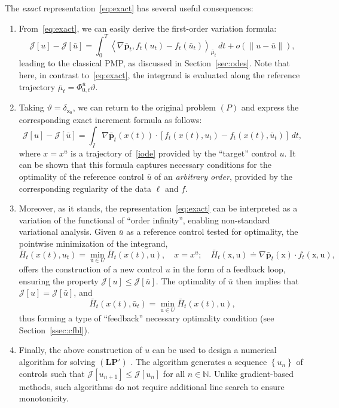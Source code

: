 \documentclass[sn-mathphys-num]{sn-jnl}
\numberwithin{equation}{section}
\theoremstyle{mythm}
\theoremstyle{mydef}
\begin{document}
\medskip

The \emph{exact} representation~\eqref{eq:exact} has several useful consequences:
\begin{enumerate}
  \item From~\eqref{eq:exact}, we can easily derive the first-order variation formula:
\begin{equation*}
  \mathcal{J}[u] - \mathcal{J}[\bar{u}] = \int_0^T \left<\nabla \bar{\bm p}_t, f_t(u_t)-f_t(\bar{u}_t)\right>_{\bar{\mu}_t} \, d t + o(\|u-\bar{u}\|), 
\end{equation*}
leading to the classical PMP, as discussed in Section~\ref{sec:odes}. Note that here, in contrast to~\eqref{eq:exact}, the integrand is evaluated along the reference trajectory \( \bar{\mu}_t = \Phi^{\bar{u}}_{0,t} \vartheta \). 

\item Taking \( \vartheta = \delta_{\mathrm{x}_0} \), we can return to the original problem \( (P) \) and express the corresponding exact increment formula as follows:
\begin{equation*}
  \mathcal{J}[u] - \mathcal{J}[\bar{u}] = \int_I \nabla \bar{\bm p}_t\left(x(t)\right)\cdot \left[f_t\left(x(t),u_t\right)-f_t\left(x(t),\bar{u}_t\right)\right] \, d t,
\end{equation*}
where \( x=x^u \) is a trajectory of~\eqref{iode} provided by the ``target'' control \( u \). It can be shown that this formula captures necessary conditions for the optimality of the reference control $\bar u$ of an \emph{arbitrary order}, provided by the corresponding regularity of the data \( \ell \) and \( f \).

\item Moreover, as it stands, the representation~\eqref{eq:exact} can be interpreted as a variation of the functional of ``order infinity'', enabling non-standard variational analysis. Given \( \bar{u} \) as a reference control tested for optimality, the pointwise minimization of the integrand,
\[
    \bar{H}_t(x(t), u_t) = \min_{\mathrm{u} \in U} \bar{H}_t(x(t), \mathrm{u}), \quad x = x^{u}; \quad \bar{H}_t(\mathrm{x}, \mathrm{u}) \doteq \nabla \bar{\bm p}_t\left(\mathrm{x}\right)\cdot f_t\left(\mathrm{x}, \mathrm{u}\right),
\]
offers the construction of a new control \( u \) in the form of a feedback loop, ensuring the property \( \mathcal{J}[u] \leq \mathcal{J}[\bar{u}] \). The optimality of \( \bar{u} \) then implies that \( \mathcal{J}[u] = \mathcal{J}[\bar{u}] \), and
\[
    \bar{H}_t(x(t), \bar{u}_t) = \min_{\mathrm{u} \in U} \bar{H}_t(x(t), \mathrm{u}),
\]
thus forming a type of ``feedback'' necessary optimality condition (see Section~\ref{ssec:cfbl}).

\item Finally, the above construction of \( u \) can be used to design a numerical algorithm for solving \( (\bm{LP}') \) \cite{pogodaevExactFormulaeIncrement2024}. The algorithm generates a sequence \( \left\{u_n\right\} \) of controls such that \( \mathcal{J}[u_{n+1}] \leq \mathcal{J}[u_n] \) for all \( n \in \mathbb{N} \). Unlike gradient-based methods, such algorithms do not require additional line search to ensure monotonicity. 
\end{enumerate}
\end{document}
